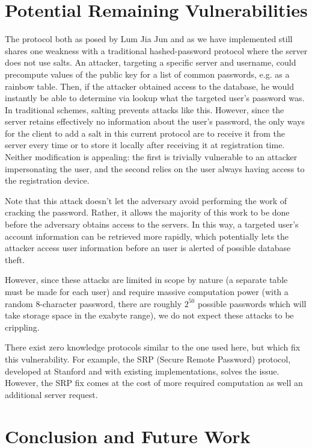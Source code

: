 \documentclass[11pt]{article}
\begin{document}
\normalsize

\section{Potential Remaining Vulnerabilities}

The protocol both as posed by Lum Jia Jun and as we have implemented still shares one weakness with a traditional hashed-password protocol where the server does not use salts.  An attacker, targeting a specific server and username, could precompute values of the public key for a list of common passwords, e.g. as a rainbow table.  Then, if the attacker obtained access to the database, he would instantly be able to determine via lookup what the targeted user's password was.  In traditional schemes, salting prevents attacks like this.  However, since the server retains effectively no information about the user's password, the only ways for the client to add a salt in this current protocol are to receive it from the server every time or to store it locally after receiving it at registration time.  Neither modification is appealing: the first is trivially vulnerable to an attacker impersonating the user, and the second relies on the user always having access to the registration device.

Note that this attack doesn't let the adversary avoid performing the work of cracking the password.  Rather, it allows the majority of this work to be done before the adversary obtains access to the servers.  In this way, a targeted user's account information can be retrieved more rapidly, which potentially lets the attacker access user information before an user is alerted of possible database theft.

However, since these attacks are limited in scope by nature (a separate table must be made for each user) and require massive computation power (with a random 8-character password, there are roughly $2^{50}$ possible passwords which will take storage space in the exabyte range), we do not expect these attacks to be crippling.

There exist zero knowledge protocols similar to the one used here, but which fix this vulnerability.  For example, the SRP (Secure Remote Password) protocol, developed at Stanford and with existing implementations, solves the issue.  However, the SRP fix comes at the cost of more required computation as well an additional server request. \cite{Wu} 

\section{Conclusion and Future Work}
\end{document}
